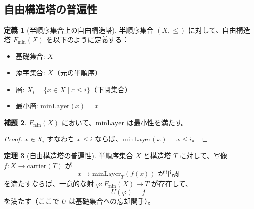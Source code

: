 \documentclass[a4paper,12pt]{ltjsarticle}
\theoremstyle{definition}
\newtheorem{definition}{定義}[section]
\newtheorem{theorem}[definition]{定理}
\newtheorem{lemma}[definition]{補題}
\begin{document}
\subsection{自由構造塔の普遍性}

\begin{definition}[半順序集合上の自由構造塔]
\label{def:free-tower-min}
半順序集合 $(X, \leq)$ に対して、自由構造塔 $F_{\min}(X)$ を以下のように定義する：
\begin{itemize}
\item 基礎集合: $X$
\item 添字集合: $X$（元の半順序）
\item 層: $X_i = \{x \in X \mid x \leq i\}$（下閉集合）
\item 最小層: $\mathrm{minLayer}(x) = x$
\end{itemize}
\end{definition}

\begin{lemma}
$F_{\min}(X)$ において、$\mathrm{minLayer}$ は最小性を満たす。
\end{lemma}

\begin{proof}
$x \in X_i$ すなわち $x \leq i$ ならば、$\mathrm{minLayer}(x) = x \leq i$。
\end{proof}

\begin{theorem}[自由構造塔の普遍性]
\label{thm:free-tower-universality}
半順序集合 $X$ と構造塔 $T$ に対して、写像 $f: X \to \mathrm{carrier}(T)$ が
\[
\text{$x \mapsto \mathrm{minLayer}_T(f(x))$ が単調}
\]
を満たすならば、一意的な射 $\varphi: F_{\min}(X) \to T$ が存在して、
\[
U(\varphi) = f
\]
を満たす（ここで $U$ は基礎集合への忘却関手）。
\end{theorem}
\end{document}
